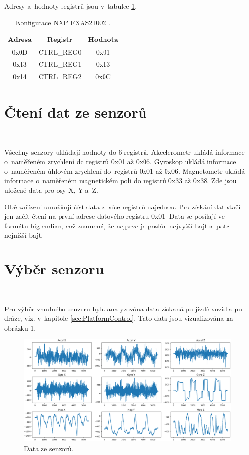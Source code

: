 Adresy a~hodnoty registrů jsou v~tabulce \ref{tab:FXAS21002}.

\begin{table}[!h]
    \centering
    \begin{tabular}{ccc}
        \hline
        \textbf{Adresa} & \textbf{Registr} & \textbf{Hodnota} \\
        \hline
        0x0D            & CTRL\_REG0       & 0x01             \\
        0x13            & CTRL\_REG1       & 0x13             \\
        0x14            & CTRL\_REG2       & 0x0C             \\
        \hline
    \end{tabular}
    \caption{Konfigurace NXP FXAS21002 \cite{FXAS21002}.}
    \label{tab:FXAS21002}
\end{table}

\section{Čtení dat ze senzorů}\

Všechny senzory ukládají hodnoty do 6 registrů. Akcelerometr ukládá informace
o~naměřeném zrychlení do registrů 0x01 až 0x06. Gyroskop ukládá informace 
o~naměřeném úhlovém zrychlení do~registrů 0x01 až 0x06. Magnetometr ukládá 
informace o~naměřeném magnetickém poli do registrů 0x33 až 0x38. Zde jsou 
uložené data pro osy X, Y a~Z.

Obě zařízení umožňují číst data z~více registrů najednou. Pro získání dat stačí jen
začít čtení na první adrese datového registru 0x01. Data se posílají ve formátu big
endian, což znamená, že nejprve je poslán nejvyšší bajt a~poté nejnižší bajt.

\section{Výběr senzoru}\

Pro výběr vhodného senzoru byla analyzována data získaná po jízdě vozidla po dráze,
viz. v~kapitole \ref{sec:PlatformControl}. Tato data jsou vizualizována na obrázku
\ref{fig:Sensors}.
\begin{figure}[!h]
    \centering
    \includegraphics[width = 1\linewidth]{Figures/Sensors.png}
    \caption{Data ze senzorů.}
    \label{fig:Sensors}
\end{figure}

